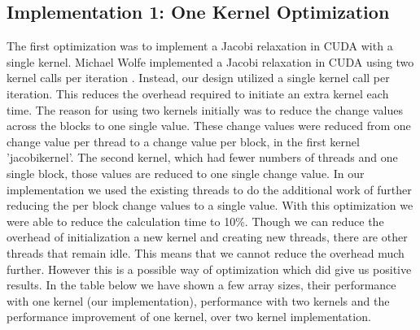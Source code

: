 \documentclass[10pt]{article}
\begin{document}
\begin{multicols}{2}
    \subsection{Implementation 1: One Kernel Optimization}
    The first optimization was to implement a Jacobi relaxation in CUDA with a single kernel.
    Michael Wolfe implemented a Jacobi relaxation in CUDA using two kernel calls per iteration \cite{michael}.
    Instead, our design utilized a single kernel call per iteration.
    This reduces the overhead required to initiate an extra kernel each time.
    The reason for using two kernels initially was to reduce the change values across the blocks to one single value.
    These change values were reduced from one change value per thread to a change value per block, in the first kernel 'jacobikernel'.
    The second kernel, which had fewer numbers of threads and one single block, those values are reduced to one single change value.
    In our implementation we used the existing threads to do the additional work of further reducing the per block change values to a single value.
    With this optimization we were able to reduce the calculation time to 10\%.
    Though we can reduce the overhead of initialization a new kernel and creating new threads, there are other threads that remain idle.
    This means that we cannot reduce the overhead much further.
    However this is a possible way of optimization which did give us positive results.
    In the table below we have shown a few array sizes, their performance with one kernel (our implementation), performance with two kernels \cite{michael} and the performance improvement of one kernel, over two kernel implementation.


\end{multicols}
\end{document}
